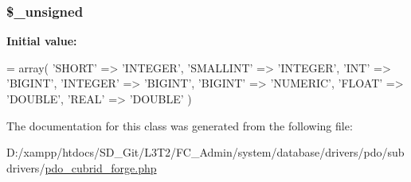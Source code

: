 \subsubsection[{\$\+\_\+unsigned}]{\setlength{\rightskip}{0pt plus 5cm}\$\+\_\+unsigned\hspace{0.3cm}{\ttfamily [protected]}}\label{class_c_i___d_b__pdo__cubrid__forge_aae977ae6d61fa183f0b25422b6ddc31c}
{\bfseries Initial value\+:}
\begin{DoxyCode}
= array(
        \textcolor{stringliteral}{'SHORT'}     => \textcolor{stringliteral}{'INTEGER'},
        \textcolor{stringliteral}{'SMALLINT'}  => \textcolor{stringliteral}{'INTEGER'},
        \textcolor{stringliteral}{'INT'}       => \textcolor{stringliteral}{'BIGINT'},
        \textcolor{stringliteral}{'INTEGER'}   => \textcolor{stringliteral}{'BIGINT'},
        \textcolor{stringliteral}{'BIGINT'}    => \textcolor{stringliteral}{'NUMERIC'},
        \textcolor{stringliteral}{'FLOAT'}     => \textcolor{stringliteral}{'DOUBLE'},
        \textcolor{stringliteral}{'REAL'}      => \textcolor{stringliteral}{'DOUBLE'}
    )
\end{DoxyCode}


The documentation for this class was generated from the following file\+:\begin{DoxyCompactItemize}
\item 
D\+:/xampp/htdocs/\+S\+D\+\_\+\+Git/\+L3\+T2/\+F\+C\+\_\+\+Admin/system/database/drivers/pdo/subdrivers/\hyperlink{pdo__cubrid__forge_8php}{pdo\+\_\+cubrid\+\_\+forge.\+php}\end{DoxyCompactItemize}
